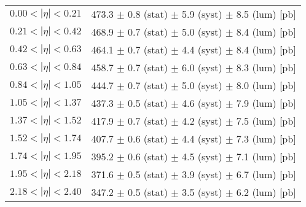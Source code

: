\begin{tabular}{lc}
\hline
$0.00 < |\eta| <0.21$          & 473.3 $\pm$ 0.8 (stat) $\pm$ 5.9 (syst) $\pm$ 8.5 (lum) [pb]  \\
$0.21 < |\eta| <0.42$          & 468.9 $\pm$ 0.7 (stat) $\pm$ 5.0 (syst) $\pm$ 8.4 (lum) [pb]  \\
$0.42 < |\eta| <0.63$          & 464.1 $\pm$ 0.7 (stat) $\pm$ 4.4 (syst) $\pm$ 8.4 (lum) [pb]  \\
$0.63 < |\eta| <0.84$          & 458.7 $\pm$ 0.7 (stat) $\pm$ 6.0 (syst) $\pm$ 8.3 (lum) [pb]  \\
$0.84 < |\eta| <1.05$          & 444.7 $\pm$ 0.7 (stat) $\pm$ 5.0 (syst) $\pm$ 8.0 (lum) [pb]  \\
$1.05 < |\eta| <1.37$          & 437.3 $\pm$ 0.5 (stat) $\pm$ 4.6 (syst) $\pm$ 7.9 (lum) [pb]  \\
$1.37 < |\eta| <1.52$          & 417.9 $\pm$ 0.7 (stat) $\pm$ 4.2 (syst) $\pm$ 7.5 (lum) [pb]  \\
$1.52 < |\eta| <1.74$          & 407.7 $\pm$ 0.6 (stat) $\pm$ 4.4 (syst) $\pm$ 7.3 (lum) [pb]  \\
$1.74 < |\eta| <1.95$          & 395.2 $\pm$ 0.6 (stat) $\pm$ 4.5 (syst) $\pm$ 7.1 (lum) [pb]  \\
$1.95 < |\eta| <2.18$          & 371.6 $\pm$ 0.5 (stat) $\pm$ 3.9 (syst) $\pm$ 6.7 (lum) [pb]  \\
$2.18 < |\eta| <2.40$          & 347.2 $\pm$ 0.5 (stat) $\pm$ 3.5 (syst) $\pm$ 6.2 (lum) [pb]  \\
\hline
\end{tabular}
